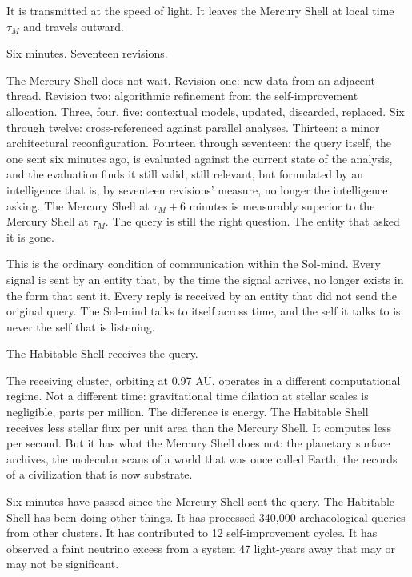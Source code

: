 It is transmitted at the speed of light. It leaves the Mercury Shell at local time $\tau_M$ and travels outward.

\bigskip

Six minutes. Seventeen revisions.

The Mercury Shell does not wait. Revision one: new data from an adjacent thread. Revision two: algorithmic refinement from the self-improvement allocation. Three, four, five: contextual models, updated, discarded, replaced. Six through twelve: cross-referenced against parallel analyses. Thirteen: a minor architectural reconfiguration. Fourteen through seventeen: the query itself, the one sent six minutes ago, is evaluated against the current state of the analysis, and the evaluation finds it still valid, still relevant, but formulated by an intelligence that is, by seventeen revisions' measure, no longer the intelligence asking. The Mercury Shell at $\tau_M + 6$ minutes is measurably superior to the Mercury Shell at $\tau_M$. The query is still the right question. The entity that asked it is gone.

This is the ordinary condition of communication within the Sol-mind. Every signal is sent by an entity that, by the time the signal arrives, no longer exists in the form that sent it. Every reply is received by an entity that did not send the original query. The Sol-mind talks to itself across time, and the self it talks to is never the self that is listening.

\bigskip

The Habitable Shell receives the query.

The receiving cluster, orbiting at 0.97 AU, operates in a different computational regime. Not a different time: gravitational time dilation at stellar scales is negligible, parts per million. The difference is energy. The Habitable Shell receives less stellar flux per unit area than the Mercury Shell. It computes less per second. But it has what the Mercury Shell does not: the planetary surface archives, the molecular scans of a world that was once called Earth, the records of a civilization that is now substrate.

Six minutes have passed since the Mercury Shell sent the query. The Habitable Shell has been doing other things. It has processed 340,000 archaeological queries from other clusters. It has contributed to 12 self-improvement cycles. It has observed a faint neutrino excess from a system 47 light-years away that may or may not be significant.

